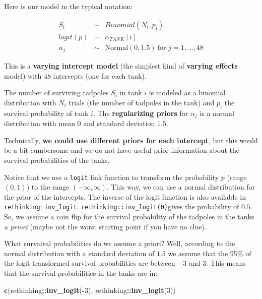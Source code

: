 \documentclass[
]{article}
\newenvironment{Shaded}{\begin{snugshade}}{\end{snugshade}}
\newcommand{\DecValTok}[1]{\textcolor[rgb]{0.00,0.00,0.81}{#1}}
\newcommand{\FunctionTok}[1]{\textcolor[rgb]{0.13,0.29,0.53}{\textbf{#1}}}
\newcommand{\NormalTok}[1]{#1}
\newcommand{\SpecialCharTok}[1]{\textcolor[rgb]{0.81,0.36,0.00}{\textbf{#1}}}
\begin{document}
Here is our model in the typical notation:

\[
\begin{array}{rcl}
S_i &\sim& Binomial(N_i, p_i) \\
logit(p) &=& \alpha_{TANK}[i] \\
\alpha_j &\sim& \text{Normal}(0, 1.5)~\text{for } j=1,\ldots,48
\end{array}
\]

This is a \textbf{varying intercept model} (the simplest kind of
\textbf{varying effects} model) with \(48\) intercepts (one for each
tank).

The number of surviving tadpoles \(S_i\) in tank \(i\) is modeled as a
binomial distribution with \(N_i\) trials (the number of tadpoles in the
tank) and \(p_i\) the survival probability of tank \(i\). The
\textbf{regularizing priors} for \(\alpha_j\) is a normal distribution
with mean \(0\) and standard deviation \(1.5\).

Technically, \textbf{we could use different priors for each intercept},
but this would be a bit cumbersome and we do not have useful prior
information about the survival probabilities of the tanks.

Notice that we use a \texttt{logit} link function to transform the
probability \(p\) (range \((0,1)\)) to the range \((-\infty, \infty)\).
This way, we can use a normal distribution for the prior of the
intercepts. The inverse of the logit function is also available in
\texttt{rethinking}: \texttt{inv\_logit}.
\texttt{rethinking::inv\_logit(0)}gives the probability of \(0.5\). So,
we assume a coin flip for the survival probability of the tadpoles in
the tanks \emph{a priori} (maybe not the worst starting point if you
have no clue).

What survaival probabilities do we assume a priori? Well, according to
the normal distribution with a standard deviation of \(1.5\) we assume
that the 95\% of the logit-transformed survival probabilities are
between \(-3\) and \(3\). This means that the survival probabilities in
the tanks are in:

\begin{Shaded}
\begin{Highlighting}[]
\FunctionTok{c}\NormalTok{(rethinking}\SpecialCharTok{::}\FunctionTok{inv\_logit}\NormalTok{(}\SpecialCharTok{{-}}\DecValTok{3}\NormalTok{), rethinking}\SpecialCharTok{::}\FunctionTok{inv\_logit}\NormalTok{(}\DecValTok{3}\NormalTok{))}
\end{Highlighting}
\end{Shaded}
\end{document}
